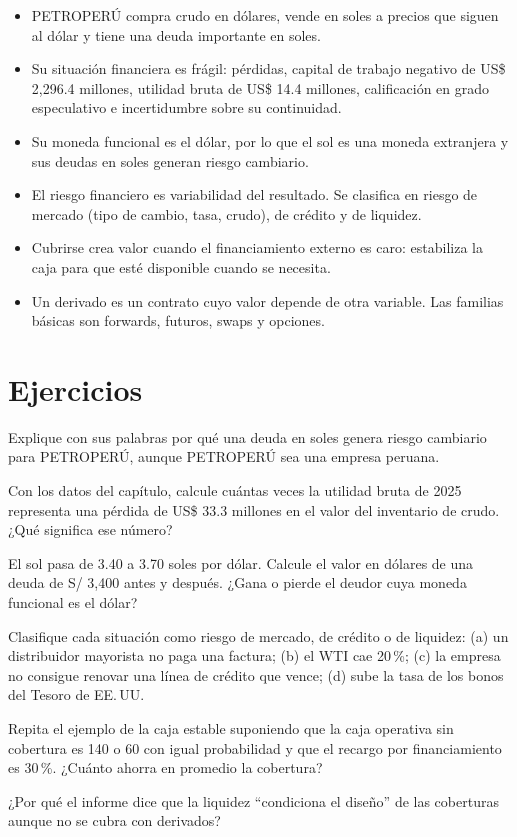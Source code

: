 \begin{resumen}
\begin{itemize}
\item PETROPERÚ compra crudo en dólares, vende en soles a precios que siguen al dólar y tiene una deuda importante en soles.
\item Su situación financiera es frágil: pérdidas, capital de trabajo negativo de US\$ 2,296.4 millones, utilidad bruta de US\$ 14.4 millones, calificación en grado especulativo e incertidumbre sobre su continuidad.
\item Su moneda funcional es el dólar, por lo que el sol es una moneda extranjera y sus deudas en soles generan riesgo cambiario.
\item El riesgo financiero es variabilidad del resultado. Se clasifica en riesgo de mercado (tipo de cambio, tasa, crudo), de crédito y de liquidez.
\item Cubrirse crea valor cuando el financiamiento externo es caro: estabiliza la caja para que esté disponible cuando se necesita.
\item Un derivado es un contrato cuyo valor depende de otra variable. Las familias básicas son forwards, futuros, swaps y opciones.
\end{itemize}
\end{resumen}

\section*{Ejercicios}

\ejercicio[conceptual] Explique con sus palabras por qué una deuda en soles genera riesgo cambiario para PETROPERÚ, aunque PETROPERÚ sea una empresa peruana.

\ejercicio[cálculo] Con los datos del capítulo, calcule cuántas veces la utilidad bruta de 2025 representa una pérdida de US\$ 33.3 millones en el valor del inventario de crudo. ¿Qué significa ese número?

\ejercicio[cálculo] El sol pasa de 3.40 a 3.70 soles por dólar. Calcule el valor en dólares de una deuda de S/ 3,400 antes y después. ¿Gana o pierde el deudor cuya moneda funcional es el dólar?

\ejercicio[conceptual] Clasifique cada situación como riesgo de mercado, de crédito o de liquidez: (a) un distribuidor mayorista no paga una factura; (b) el WTI cae 20\,\%; (c) la empresa no consigue renovar una línea de crédito que vence; (d) sube la tasa de los bonos del Tesoro de EE.\,UU.

\ejercicio[aplicación] Repita el ejemplo de la caja estable suponiendo que la caja operativa sin cobertura es 140 o 60 con igual probabilidad y que el recargo por financiamiento es 30\,\%. ¿Cuánto ahorra en promedio la cobertura?

\ejercicio[conceptual] ¿Por qué el informe dice que la liquidez \enquote{condiciona el diseño} de las coberturas aunque no se cubra con derivados?
